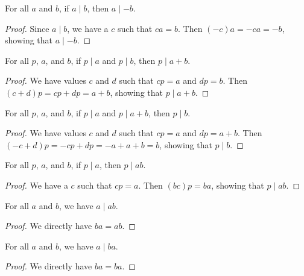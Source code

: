 \documentclass[../../math.tex]{subfiles}
\begin{document}
\begin{theorem} \label{divides_neg}
    For all $a$ and $b$, if $a \mid b$, then $a \mid -b$.
\end{theorem}
\begin{proof}
    Since $a \mid b$, we have a $c$ such that $ca = b$.  Then $(-c)a = -ca =
    -b$, showing that $a \mid -b$.
\end{proof}

\begin{theorem} \label{plus_stays_divides}
    For all $p$, $a$, and $b$, if $p \mid a$ and $p \mid b$, then $p \mid a +
    b$.
\end{theorem}
\begin{proof}
    We have values $c$ and $d$ such that $cp = a$ and $dp = b$.  Then $(c + d)p
    = cp + dp = a + b$, showing that $p \mid a + b$.
\end{proof}

\begin{theorem} \label{plus_divides_back}
    For all $p$, $a$, and $b$, if $p \mid a$ and $p \mid a + b$, then $p \mid
    b$.
\end{theorem}
\begin{proof}
    We have values $c$ and $d$ such that $cp = a$ and $dp = a + b$.  Then $(-c +
    d)p = -cp + dp = -a + a + b = b$, showing that $p \mid b$.
\end{proof}

\begin{theorem} \label{mult_factors_extend}
    For all $p$, $a$, and $b$, if $p \mid a$, then $p \mid ab$.
\end{theorem}
\begin{proof}
    We have a $c$ such that $cp = a$.  Then $(bc)p = ba$, showing that $p \mid
    ab$.
\end{proof}

\begin{theorem} \label{mult_div_lself}
    For all $a$ and $b$, we have $a \mid ab$.
\end{theorem}
\begin{proof}
    We directly have $ba = ab$.
\end{proof}

\begin{theorem} \label{mult_div_rself}
    For all $a$ and $b$, we have $a \mid ba$.
\end{theorem}
\begin{proof}
    We directly have $ba = ba$.
\end{proof}
\end{document}
